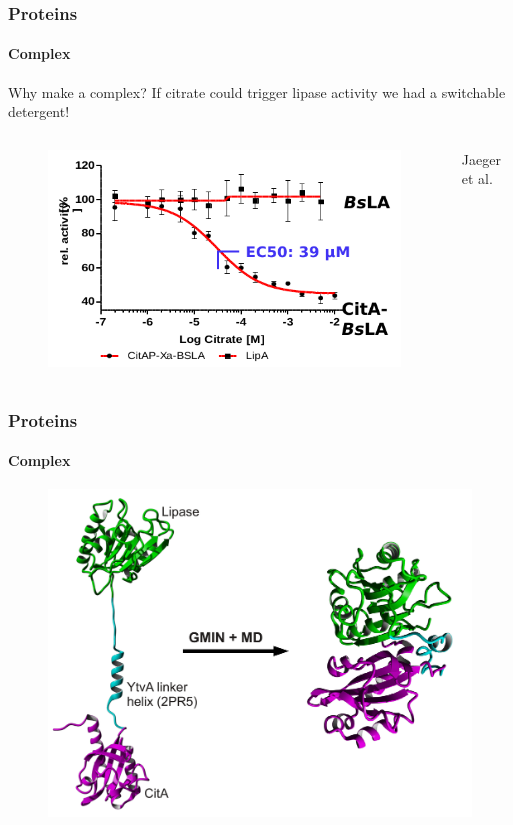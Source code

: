 \documentclass[english]{beamer}
\begin{document}

\begin{frame}
    \frametitle{Proteins}
    \framesubtitle{Complex}

    \begin{block}{Why make a complex?}
        If citrate could trigger lipase activity we had a switchable detergent!
    \end{block}

    \pause

    \begin{columns}[t]
        \begin{figure}
            \includegraphics[width=.7\linewidth]{figures/complex/dose_response_curve.png}
        \end{figure}       

        \tiny
        Jaeger et al.
    \end{columns}

\end{frame}  


\begin{frame}
    \frametitle{Proteins}
    \framesubtitle{Complex}

    \begin{figure}
        \includegraphics[width=.9\linewidth]{figures/complex/complex_folding.pdf}
    \end{figure}       

\end{frame}   
\end{document}
